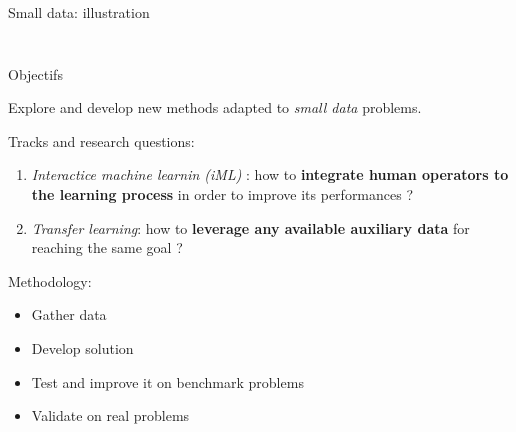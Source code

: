 \documentclass{beamer}
\begin{document}
\begin{frame}{Small data: illustration}
\begin{columns}
\begin{column}{0.5\textwidth}
\begin{figure}[!h]
		\end{figure}
\end{column}
\end{columns}
\end{frame}

\begin{frame}{Objectifs}
	\begin{center}
		\large
		Explore and develop new methods adapted to \textit{small data} problems.
	\end{center}
	
	\vfill
	Tracks and research questions: 
	\begin{enumerate}
		\item \textit{Interactice machine learnin (iML)} : how to \textbf{integrate human operators to the learning process} in order to improve its performances ?
		\item \textit{Transfer learning}: how to \textbf{leverage any available auxiliary data} for reaching the same goal ? 
	\end{enumerate}

	\vfill
	Methodology:
	\begin{itemize}
		\item Gather data 
		\item Develop solution 
		\item Test and improve it on benchmark problems 
		\item Validate on real problems 
	\end{itemize}
\end{frame}
 
\end{document}
